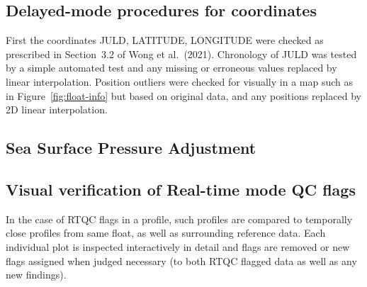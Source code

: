 \documentclass{article}
\begin{document}
\subsection{Delayed-mode procedures for coordinates}\label{sec:DM-coordinates}
First the coordinates JULD, LATITUDE, LONGITUDE were checked as prescribed
in Section~3.2 of Wong et al.~(2021).
%
Chronology of JULD was tested by a simple automated test and any missing
or erroneous values replaced by linear interpolation.
%
Position outliers were checked for visually in a map such as in
Figure~\ref{fig:float-info} but based on original data, and any positions
replaced by 2D linear interpolation.

\newpage
\subsection{Sea Surface Pressure Adjustment}





\newpage
\subsection{Visual verification of Real-time mode QC flags}
In the case of RTQC flags in a profile, such profiles are compared to
temporally close profiles from same float, as well as surrounding
reference data. Each individual plot is inspected interactively in detail
and flags are removed or new flags assigned when judged necessary (to both
RTQC flagged data as well as any new findings).
%
 
\end{document}
